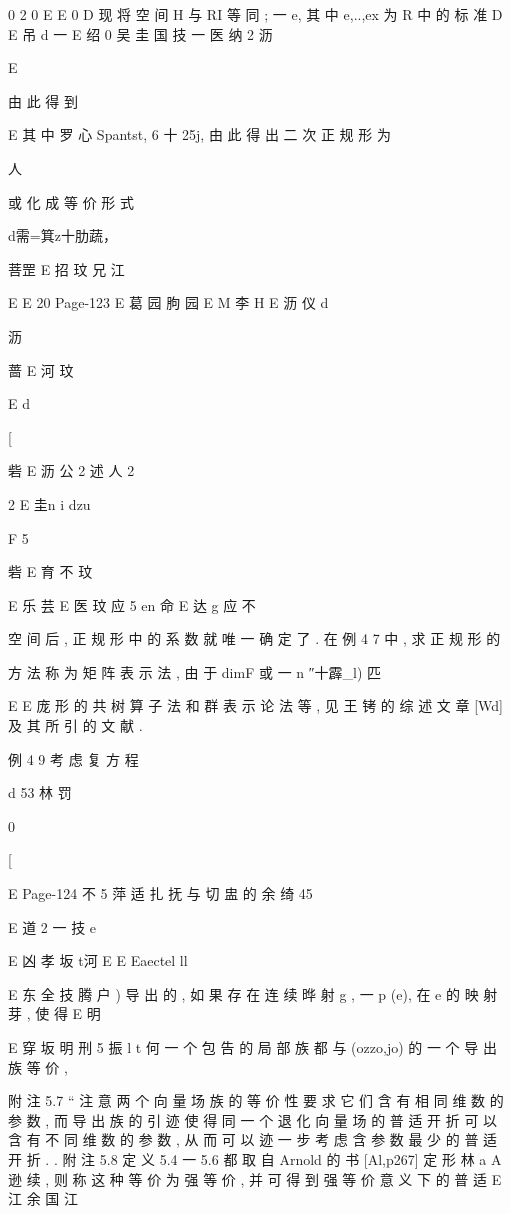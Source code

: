 {{0
2
0
E
E
0 D
现 将 空 间 H 与 RI 等 同 ; 一 e, 其 中 e,..,ex 为 R 中 的 标 准
D
E 吊 d 一
E 绍 0 吴 圭 国 技 一
医 纳 2 沥

E

由 此 得 到

E
其 中 罗 心 Spantst, 6 十 25j, 由 此 得 出 二 次 正 规 形 为

人

或 化 成 等 价 形 式

d需=箕z十肋蔬，

菩罡 E 招 玟 兄 江

E
E 20
Page-123
E 葛
园 朐 园 E
M 李 H
E 沥 仪 d

沥

蔷 E 河 玟

E
d

[

砦 E 沥 公 2 述 人 2

2
E 圭n i
dzu

F 5

砦 E 育 不 玟

E 乐 芸
E 医 玟 应 5 en 命
E 达 g 应 不

空 间 后 , 正 规 形 中 的 系 数 就 唯 一 确 定 了 . 在 例 4 7 中 , 求 正 规 形 的

方 法 称 为 矩 阵 表 示 法 , 由 于 dimF 或 一 n ″十霹_l) 匹

E
E 庞
形 的 共 树 算 子 法 和 群 表 示 论 法 等 , 见 王 铐 的 综 述 文 章 [Wd] 及 其
所 引 的 文 献 .

例 4 9 考 虑 复 方 程

d 53
林 罚

0

[

E
Page-124
不 5 萍 适 扎 抚 与 切 盅 的 余 绮 45

E
道 2 一 技 e

E 凶 孝 坂 t河
E
E
Eaectel ll

E 东 全 技 腾
户 ) 导 出 的 , 如 果 存 在 连 续 晔 射 g , 一 p (e), 在 e 的 映 射 芽 , 使 得
E 明

E 穿 坂 明 刑 5 振 l
t
何 一 个 包 告 的 局 部 族 都 与 (ozzo,jo) 的 一 个 导 出 族 等 价 ,

附 注 5.7 “ 注 意 两 个 向 量 场 族 的 等 价 性 要 求 它 们 含 有 相 同 维
数 的 参 数 , 而 导 出 族 的 引 迹 使 得 同 一 个 退 化 向 量 场 的 普 适 开 折 可
以 含 有 不 同 维 数 的 参 数 , 从 而 可 以 迹 一 步 考 虑 含 参 数 最 少 的 普 适
开 折 .
. 附 注 5.8 定 义 5.4 一 5.6 都 取 自 Arnold 的 书 [Al,p267] 定
形 林
a
A 逊 续 , 则 称 这 种 等 价 为 强 等 价 , 并 可 得 到 强 等 价 意 义 下 的 普 适
E 江 余
国 江

}}
